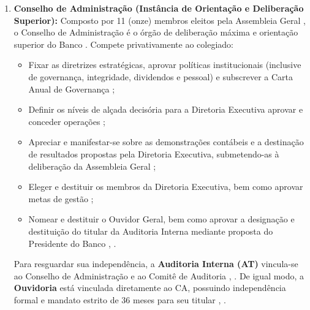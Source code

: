\begin{enumerate}[label=\textbf{\alph*)}]
    \item \textbf{Conselho de Administração (Instância de Orientação e Deliberação Superior):} Composto por 11 (onze) membros eleitos pela Assembleia Geral \cite[art.~33]{bndes2025estatuto}, o Conselho de Administração é o órgão de deliberação máxima e orientação superior do Banco \cite[arts.~17,~I e 18]{bndes2025estatuto}. Compete privativamente ao colegiado:
          \begin{itemize}
              \item Fixar as diretrizes estratégicas, aprovar políticas institucionais (inclusive de governança, integridade, dividendos e pessoal) e subscrever a Carta Anual de Governança \cite[arts.~11 e 36,~VIII e IX]{bndes2025estatuto};
              \item Definir os níveis de alçada decisória para a Diretoria Executiva aprovar e conceder operações \cite[art.~43,~III]{bndes2025estatuto};
              \item Apreciar e manifestar-se sobre as demonstrações contábeis e a destinação de resultados propostas pela Diretoria Executiva, submetendo-as à deliberação da Assembleia Geral \cite[arts.~16,~I, 51,~II e 69]{bndes2025estatuto};
              \item Eleger e destituir os membros da Diretoria Executiva, bem como aprovar metas de gestão \cite[arts.~36,~VII e 39,~\S~1º]{bndes2025estatuto};
              \item Nomear e destituir o Ouvidor Geral, bem como aprovar a designação e destituição do titular da Auditoria Interna mediante proposta do Presidente do Banco \cite[art.~76]{bndes2025estatuto}, \cite[p.~11, itens II.2 e III.2]{bndes2026oib}.
          \end{itemize}
          Para resguardar sua independência, a \textbf{Auditoria Interna (AT)} vincula-se ao Conselho de Administração e ao Comitê de Auditoria \cite[arts.~52 e 57]{bndes2025estatuto}, \cite[p.~11, item II.2; p.~13]{bndes2026oib}. De igual modo, a \textbf{Ouvidoria} está vinculada diretamente ao CA, possuindo independência formal e mandato estrito de 36 meses para seu titular \cite[arts.~75 e 76]{bndes2025estatuto}, \cite[p.~11, item II.5; p.~27]{bndes2026oib}.


\end{enumerate}
